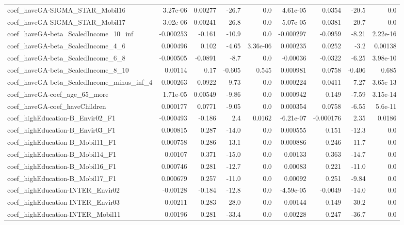 \begin{tabular}{lrrrrrrrr}
coef_haveGA-SIGMA_STAR_Mobil16 & 3.27e-06 & 0.00277 & -26.7 & 0.0 & 4.61e-05 & 0.0354 & -20.5 & 0.0 \\
coef_haveGA-SIGMA_STAR_Mobil17 & 3.02e-06 & 0.00241 & -26.8 & 0.0 & 5.07e-05 & 0.0381 & -20.7 & 0.0 \\
coef_haveGA-beta_ScaledIncome_10_inf & -0.000253 & -0.161 & -10.9 & 0.0 & -0.000297 & -0.0959 & -8.21 & 2.22e-16 \\
coef_haveGA-beta_ScaledIncome_4_6 & 0.000496 & 0.102 & -4.65 & 3.36e-06 & 0.000235 & 0.0252 & -3.2 & 0.00138 \\
coef_haveGA-beta_ScaledIncome_6_8 & -0.000505 & -0.0891 & -8.7 & 0.0 & -0.00036 & -0.0322 & -6.25 & 3.98e-10 \\
coef_haveGA-beta_ScaledIncome_8_10 & 0.00114 & 0.17 & -0.605 & 0.545 & 0.000981 & 0.0758 & -0.406 & 0.685 \\
coef_haveGA-beta_ScaledIncome_minus_inf_4 & -0.000263 & -0.0922 & -9.73 & 0.0 & -0.000224 & -0.0411 & -7.27 & 3.65e-13 \\
coef_haveGA-coef_age_65_more & 1.71e-05 & 0.00549 & -9.86 & 0.0 & 0.000942 & 0.149 & -7.59 & 3.15e-14 \\
coef_haveGA-coef_haveChildren & 0.000177 & 0.0771 & -9.05 & 0.0 & 0.000354 & 0.0758 & -6.55 & 5.6e-11 \\
coef_highEducation-B_Envir02_F1 & -0.000493 & -0.186 & 2.4 & 0.0162 & -6.21e-07 & -0.000176 & 2.35 & 0.0186 \\
coef_highEducation-B_Envir03_F1 & 0.000815 & 0.287 & -14.0 & 0.0 & 0.000555 & 0.151 & -12.3 & 0.0 \\
coef_highEducation-B_Mobil11_F1 & 0.000758 & 0.286 & -13.1 & 0.0 & 0.000886 & 0.246 & -11.7 & 0.0 \\
coef_highEducation-B_Mobil14_F1 & 0.00107 & 0.371 & -15.0 & 0.0 & 0.00133 & 0.363 & -14.7 & 0.0 \\
coef_highEducation-B_Mobil16_F1 & 0.000746 & 0.281 & -12.7 & 0.0 & 0.00083 & 0.221 & -11.0 & 0.0 \\
coef_highEducation-B_Mobil17_F1 & 0.000679 & 0.257 & -11.0 & 0.0 & 0.00092 & 0.251 & -9.84 & 0.0 \\
coef_highEducation-INTER_Envir02 & -0.00128 & -0.184 & -12.8 & 0.0 & -4.59e-05 & -0.0049 & -14.0 & 0.0 \\
coef_highEducation-INTER_Envir03 & 0.00211 & 0.283 & -28.0 & 0.0 & 0.00144 & 0.149 & -30.2 & 0.0 \\
coef_highEducation-INTER_Mobil11 & 0.00196 & 0.281 & -33.4 & 0.0 & 0.00228 & 0.247 & -36.7 & 0.0 \\

\end{tabular}

